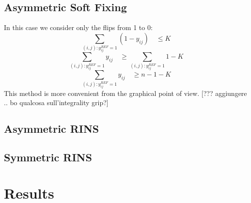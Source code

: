 \subsection{Asymmetric Soft Fixing}
In this case we consider only the flips from 1 to 0:
\[
	\sum_{(i,j):y^{REF}_{ij}=1} (1-y_{ij}) \quad \leq K
\]
\[
	\sum_{(i,j):y^{REF}_{ij}=1} y_{ij} \quad \geq \sum_{(i,j):y^{REF}_{ij}=1} 1 - K
\]
\[
	\sum_{(i,j):y^{REF}_{ij}=1} y_{ij} \quad \geq n - 1 - K
\]
This method is more convenient from the graphical point of view. 
[??? aggiungere .. bo qualcosa sull'integrality grip?]
\subsection{Asymmetric RINS}

\subsection{Symmetric RINS}
\section{Results}


